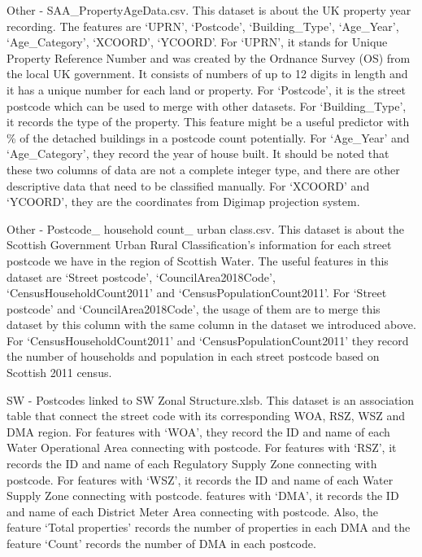 \documentclass[11pt,twoside]{article}
\numberwithin{Theorem}{section}
\numberwithin{Definition}{section}
\numberwithin{Lemma}{section}
\numberwithin{Algorithm}{section}
\numberwithin{equation}{section}
\begin{document}
\begin{enumerate}
Other - SAA\_PropertyAgeData.csv. This dataset is about the UK property year recording. The features are `UPRN', `Postcode', `Building\_Type',	`Age\_Year', `Age\_Category', `XCOORD', `YCOORD'. For `UPRN', it stands for Unique Property Reference Number and was created by the Ordnance Survey (OS) from the local UK government. It consists of numbers of up to 12 digits in length and it has a unique number for each land or property. For `Postcode', it is the street postcode which can be used to merge with other datasets. For `Building\_Type', it records the type of the property. This feature might be a useful predictor with \% of the detached buildings in a postcode count potentially. For `Age\_Year' and `Age\_Category', they record the year of house built. It should be noted that these two columns of data are not a complete integer type, and there are other descriptive data that need to be classified manually. For `XCOORD' and `YCOORD', they are the coordinates from Digimap projection system.

Other - Postcode\_ household count\_ urban class.csv. This dataset is about the Scottish Government Urban Rural Classification's information for each street postcode we have in the region of Scottish Water. The useful features in this dataset are `Street postcode', `CouncilArea2018Code', `CensusHouseholdCount2011' and `CensusPopulationCount2011'. For `Street postcode' and `CouncilArea2018Code', the usage of them are to merge this dataset by this column with the same column in the dataset we introduced above. For `CensusHouseholdCount2011' and `CensusPopulationCount2011' they record the number of households and population in each street postcode based on Scottish 2011 census.

SW - Postcodes linked to SW Zonal Structure.xlsb. This dataset is an association table that connect the street code with its corresponding WOA, RSZ, WSZ and DMA region. For features with `WOA', they record the ID and name of each Water Operational Area connecting with postcode. For features with `RSZ', it records the ID and name of each Regulatory Supply Zone connecting with postcode. For features with `WSZ', it records the ID and name of each Water Supply Zone connecting with postcode. features with `DMA', it records the ID and name of each District Meter Area connecting with postcode. Also, the feature `Total properties' records the number of properties in each DMA and the feature `Count' records the number of DMA in each postcode.

\end{enumerate}
\end{document}
